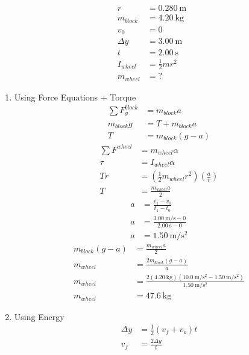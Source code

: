 \documentclass{article}
\begin{document}
\begin{align*}
	r & = \SI{0.280}{\meter} \\
	m_{block} & = \SI{4.20}{\kilogram} \\
	v_0 & = 0 \\
	\Delta y & = \SI{3.00}{\meter} \\
	t & = \SI{2.00}{\second} \\
	I_{wheel} & = \frac{1}{2}mr^2 \\
	m_{wheel} & = ?
\end{align*}
\begin{enumerate}[labelindent = 0pt, label = \textbf{Method \arabic*: }]
	\item Using Force Equations + Torque
		\begin{align*}
			\sum F_y^{block} & = m_{block}a \\
			m_{block}g & = T + m_{block}a \\
			T & = m_{block}(g - a)
		\end{align*}
		\begin{align*}
			\sum F^{wheel} & = m_{wheel}\alpha \\
			\tau & = I_{wheel}\alpha \\
			Tr & = \left( \frac{1}{2}m_{wheel}r^2 \right) \left( \frac{a}{r} \right) \\
			T & = \frac{ m_{wheel}a }{ 2 }
		\end{align*}
		\begin{align*}
			a & = \frac{ v_1 - v_0 }{ t_1 - t_0 } \\
			a & = \frac{ \SI{3.00}{\meter \per \second} - 0 }{ \SI{2.00}{\second} - 0 } \\
			a & = \SI{1.50}{\meter \per \second \squared}
		\end{align*}
		\begin{align*}
			m_{block}(g - a) & = \frac{ m_{wheel}a }{ 2 } \\
			m_{wheel} & = \frac{ 2m_{block}(g - a) }{ a } \\
			m_{wheel} & = \frac{ 2(\SI{4.20}{\kilogram})(\SI{10.0}{\meter \per \second \squared} - \SI{1.50}{\meter \per \second \squared}) }{ \SI{1.50}{\meter \per \second \squared} } \\
			m_{wheel} & = \SI{47.6}{\kilogram}
		\end{align*}
	\item Using Energy
		\begin{align*}
			\Delta y & = \frac{1}{2}(v_f + v_o)t \\
			v_f & = \frac{ 2\Delta y }{ t } \\

\end{align*}
\end{enumerate}
\end{document}
